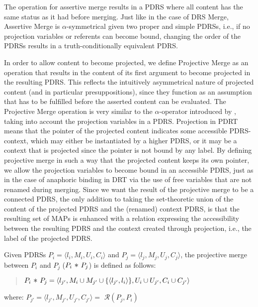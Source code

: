 \noindent The operation for assertive merge results in a PDRS where all
content has the same status as it had before merging. Just like in the case
of DRS Merge, Assertive Merge is $\alpha$-symmetrical given two proper and
simple PDRSs, i.e., if no projection variables or referents can become
bound, changing the order of the PDRSs results in a truth-conditionally
equivalent PDRS.

In order to allow content to become projected, we define Projective Merge as
an operation that results in the content of its first argument to become
projected in the resulting PDRS. This reflects the intuitively asymmetrical
nature of projected content (and in particular presuppositions), since they
function as an assumption that has to be fulfilled before the asserted
content can be evaluated. The Projective Merge operation is very similar to
the $\alpha$-operator introduced by \cite{bos2003implementing}, taking into
account the projection variables in a PDRS. Projection in PDRT means that
the pointer of the projected content indicates some accessible PDRS-context,
which may either be instantiated by a higher PDRS, or it may be a context
that is projected since the pointer is not bound by any label. By defining
projective merge in such a way that the projected content keeps its own
pointer, we allow the projection variables to become bound in an accessible
PDRS, just as in the case of anaphoric binding in DRT via the use of free
variables that are not renamed during merging. Since we want the result of
the projective merge to be a connected PDRS, the only addition to taking the
set-theoretic union of the content of the projected PDRS and the (renamed)
context PDRS, is that the resulting set of MAPs is enhanced with a relation
expressing the accessibility between the resulting PDRS and the context
created through projection, i.e., the label of the projected PDRS.

\begin{definition}\label{def:pmerge}
Given PDRSs $P_i=\langle l_i,M_i,U_i,C_i \rangle$ and 
$P_j=\langle l_j,M_j,U_j,C_j\rangle$, the projective merge between $P_i$
and $P_j$ ($P_i ~\mathlarger{\mathlarger{*}}~ P_j$) is defined as follows:
  \begin{quote}
    $P_i ~\mathlarger{\mathlarger{*}}~ P_j = 
      \langle l_{j'}, 
        M_{i}\cup M_{j'}\cup\{\langle l_{j'},l_{i}\rangle\}, 
        U_{i}\cup U_{j'},C_{i} \cup C_{j'}\rangle$
  \end{quote}
  where: $P_{j'} = \langle l_{j'}, M_{j'}, U_{j'}, C_{j'} \rangle =$ 
      $\mathcal{R}(P_j,P_i)$
\end{definition}

